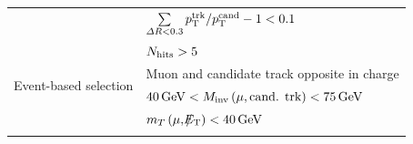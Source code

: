 \begin{table}[!h]
{\begin{tabular}{l|l }
                                                               &  $\sum \limits_{\Delta R < 0.3} p_{\text{T}}^{\text{trk}}/p_{\text{T}}^{\text{cand}} -1 < 0.1$\\  
                                                               &  $N_{\text{hits}}>5$             \\  
\midrule
\multirow{2}{*}{Event-based selection}                         &  Muon and candidate track opposite in charge                                     \\
                                                               &  $40\,\text{Ge}\kern-0.06667em\text{V}<M_{\text{inv}}\left( \mu, \text{cand. trk}  \right)<75\,\text{Ge}\kern-0.06667em\text{V}$        \\
                                                               & $m_T\left(\mu,\slash\mkern-12mu{E}_{\text{T}}\right)<40\,\text{Ge}\kern-0.06667em\text{V}$ \\

\bottomrule
\multicolumn{2}{c}{} \\
\end{tabular}}
\end{table}



